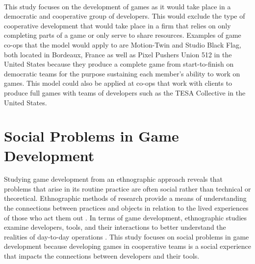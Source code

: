 \paragraph{} This study focuses on the development of games as it would take place in a democratic and cooperative group of developers. This would exclude the type of cooperative development that would take place in a firm that relies on only completing parts of a game or only serve to share resources. Examples of game co-ops that the model would apply to are Motion-Twin and Studio Black Flag, both located in Bordeaux, France as well as Pixel Pushers Union 512 in the United States because they produce a complete game from start-to-finish on democratic teams for the purpose sustaining each member's ability to work on games. This model could also be applied at co-ops that work with clients to produce full games with teams of developers such as the TESA Collective in the United States.

\section{Social Problems in Game Development}


\paragraph{} Studying game development from an ethnographic approach reveals that problems that arise in its routine practice are often social rather than technical or theoretical. Ethnographic methods of research provide a means of understanding the connections between practices and objects in relation to the lived experiences of those who act them out \autocite{apperley_game_2012}. In terms of game development, ethnographic studies examine developers, tools, and their interactions to better understand the realities of day-to-day operations \autocite{whitson_what_2020}. This study focuses on social problems in game development because developing games in cooperative teams is a social experience that impacts the connections between developers and their tools.

